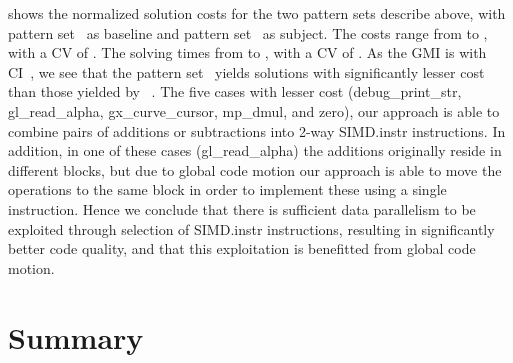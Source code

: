  shows the normalized \gls{solution}
costs for the two \glspl{pattern set} describe above, with \gls{pattern
  set}~\patternSetA{} as \gls{baseline} and \gls{pattern set}~\patternSetB{} as
\gls{subject}.
%
The costs range from
\printMinCycles{%
  \SimdVsWithoutCyclesSpeedupCyclesAvgMin,
  \SimdVsWithoutCyclesSpeedupBaselineCyclesAvgMin
} to
\printMaxCycles{%
  \SimdVsWithoutCyclesSpeedupCyclesAvgMax,
  \SimdVsWithoutCyclesSpeedupBaselineCyclesAvgMax
}, with a \gls{CV} of
\numMaxOf{
  \SimdVsWithoutCyclesSpeedupCyclesCvMax,
  \SimdVsWithoutCyclesSpeedupBaselineCyclesCvMax
}.
%
The solving times from
\printMinSolvingTime{%
  \SimdVsWithoutCyclesSpeedupPrePlusSolvingTimeAvgMin,
  \SimdVsWithoutCyclesSpeedupBaselinePrePlusSolvingTimeAvgMin
} to
\printMaxSolvingTime{%
  \SimdVsWithoutCyclesSpeedupPrePlusSolvingTimeAvgMax,
  \SimdVsWithoutCyclesSpeedupBaselinePrePlusSolvingTimeAvgMax
}, with a \gls{CV} of
\numMaxOf{
  \SimdVsWithoutCyclesSpeedupPrePlusSolvingTimeCvMax,
  \SimdVsWithoutCyclesSpeedupBaselinePrePlusSolvingTimeCvMax
}.
%
As the \gls{GMI} is \printGMI{%
  \SimdVsWithoutCyclesSpeedupCyclesRegularSpeedupGmean%
} with \gls{CI}~\printGMICI{%
  \SimdVsWithoutCyclesSpeedupCyclesRegularSpeedupCiMin%
}{%
  \SimdVsWithoutCyclesSpeedupCyclesRegularSpeedupCiMax%
}, we see that the \gls{pattern set}~\patternSetB{} yields \glspl{solution} with
significantly lesser cost than those yielded by ~\patternSetA.
%
The five cases with lesser cost ({\codeFont debug\_print\_str}, {\codeFont
  gl\_read\_alpha}, {\codeFont gx\_curve\_cursor}, {\codeFont mp\_dmul}, and
{\codeFont zero}), our approach is able to combine pairs of additions or
subtractions into \num{2}-way \gls{SIMD.instr} \glspl{instruction}.
%
In addition, in one of these cases ({\codeFont gl\_read\_alpha}) the additions
originally reside in different \glspl{block}, but due to \gls{global code
  motion} our approach is able to move the operations to the same block in order
to implement these using a single \gls{instruction}.
%
%
Hence we conclude that there is sufficient data parallelism to be exploited
through selection of \gls{SIMD.instr} \glspl{instruction}, resulting in
significantly better code quality, and that this exploitation is benefitted from
\gls{global code motion}.


\section{Summary}


